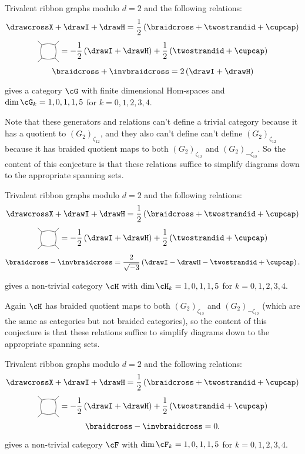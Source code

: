 \documentclass[12pt]{amsart}
\begin{document}
\begin{conjecture}
Trivalent ribbon graphs modulo $d=2$ and the following relations:
$$\drawcrossX + \drawI + \drawH = \frac{1}{2} \left(\braidcross + \twostrandid + \cupcap \right)$$
$$\ngon[45]{4} = -\frac{1}{2} \left(\drawI + \drawH \right) + \frac{1}{2} \left(\twostrandid + \cupcap\right)$$
$$\braidcross + \invbraidcross = 2 \left(\drawI + \drawH \right)$$

gives a category $\cG$ with finite dimensional Hom-spaces and $\dim \cG_k = 1,0,1,1,5$ for $k = 0,1,2,3,4$.  
\end{conjecture}

Note that these generators and relations can't define a trivial category because it has a quotient to  $(G_2)_{\zeta_12}$, and they also can't define can't define $(G_2)_{\zeta_12}$ because it has braided quotient maps to both $(G_2)_{\zeta_12}$ and $(G_2)_{-\zeta_12}$.  So the content of this conjecture is that these relations suffice to simplify diagrams down to the appropriate spanning sets.

\begin{conjecture}
Trivalent ribbon graphs modulo $d=2$ and the following relations:
$$\drawcrossX + \drawI + \drawH = \frac{1}{2} \left(\braidcross + \twostrandid + \cupcap \right)$$
$$\ngon[45]{4} = -\frac{1}{2} \left(\drawI + \drawH \right) + \frac{1}{2} \left(\twostrandid + \cupcap\right)$$
$$\braidcross - \invbraidcross = \frac{2}{\sqrt{-3}} \left(\drawI - \drawH - \twostrandid + \cupcap\right).$$

gives a non-trivial category $\cH$ with $\dim \cH_k = 1,0,1,1,5$ for $k = 0,1,2,3,4$.  
\end{conjecture}

Again $\cH$ has braided quotient maps to both $(G_2)_{\zeta_12}$ and $(G_2)_{-\zeta_12}$ (which are the same as categories but not braided categories), so the content of this conjecture is that these relations suffice to simplify diagrams down to the appropriate spanning sets.

\begin{conjecture}
Trivalent ribbon graphs modulo $d=2$ and the following relations:
$$\drawcrossX + \drawI + \drawH = \frac{1}{2} \left(\braidcross + \twostrandid + \cupcap \right)$$
$$\ngon[45]{4} = -\frac{1}{2} \left(\drawI + \drawH \right) + \frac{1}{2} \left(\twostrandid + \cupcap\right)$$
$$\braidcross - \invbraidcross = 0.$$

gives a non-trivial category $\cF$ with $\dim \cF_k = 1,0,1,1,5$ for $k = 0,1,2,3,4$.
\end{conjecture}
\end{document}
